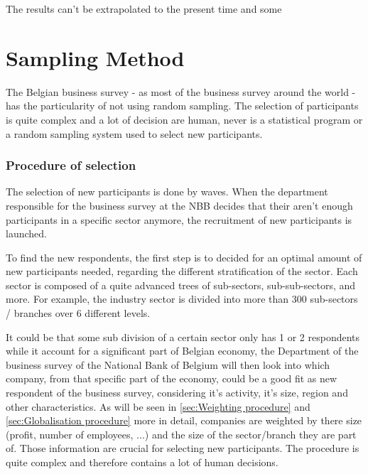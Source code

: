 \documentclass[12pt,a4paper,oneside]{book}
\begin{document}
The results can't be extrapolated to the present time and some






\section{Sampling Method}
\label{sec:Recruitment of participants}

The Belgian business survey - as most of the business survey around the world - has the particularity of not using random sampling. 
 The selection of participants is quite complex and a lot of decision are human, never is a statistical program or a random sampling system used to select new participants.

\subsubsection{Procedure of selection}

The selection of new participants is done by waves. When the department responsible for the business survey at the NBB decides that their aren't enough participants in a specific sector anymore, the recruitment of new participants is launched.

To find the new respondents, the first step is to decided for an optimal amount of new participants needed, regarding the different stratification of the sector.
Each sector is composed of a quite advanced trees of sub-sectors, sub-sub-sectors,  and more. For example, the industry sector is divided into more than 300 sub-sectors / branches over 6 different levels. 

It could be that some sub division of a certain sector only has 1 or 2 respondents while it account for a significant part of Belgian economy, the Department of the business survey of the National Bank of Belgium will then look into which company, from that specific part of the economy, could be a good fit as new respondent of the business survey, considering it's activity, it's size, region and other characteristics.
As will be seen in \autoref{sec:Weighting procedure} and \autoref{sec:Globalisation procedure} more in detail, companies are weighted by there size (profit, number of employees, ...) and the size of the sector/branch they are part of. Those information are crucial for selecting new participants.
The procedure is quite complex and therefore contains a lot of human decisions.
 
\end{document}
